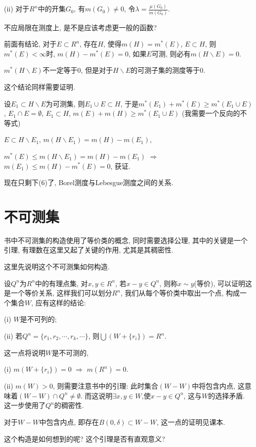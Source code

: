 \documentclass[12pt,a4paper,openany]{book}
\begin{document}
(ii) 对于$R^n$中的开集$G_0$, 有$m(G_0) \neq 0$, 令$\lambda = \frac{\mu(G_0)}{m(G_0)}$.

不应局限在测度上, 是不是应该考虑更一般的函数?

前面有结论, 对于$E \subset R^n$, 存在$H$, 使得$m(H) = m^*(E)$, $E \subset H$, 则$m^*(E) < \infty$时, $m(H) -m^*(E) = 0$, 如果$E$可测, 则必有$m(H \backslash E) = 0$.

$m^*(H \backslash E)$不一定等于0, 但是对于$H \backslash E$的可测子集的测度等于0.

这个结论同样需要证明.

设$E_1 \subset H \backslash E$为可测集, 则$E_1 \cup E \subset H$, 于是$m^*(E_1) + m^*(E) \ge m^*(E_1 \cup E)$, $E_1 \cap E = \emptyset$, $E_1 \subset H$, $m(E) + m(H) \ge m^*(E_1 \cup E)$ (我需要一个反向的不等式)

$E \subset H \backslash E_1$, $m(H \backslash E_1) = m(H) - m(E_1)$,

$m^*(E) \le m(H \backslash E_1) = m(H) - m(E_1)$ $\Rightarrow$ $m(E_1) \le m(H) - m^*(E) = 0$, 获证.

现在只剩下(6)了, Borel测度与Lebesgue测度之间的关系.

\section{不可测集}
书中不可测集的构造使用了等价类的概念, 同时需要选择公理, 其中的关键是一个引理, 有理数在这里又起了关键的作用, 尤其是其稠密性.

这里先说明这个不可测集如何构造.

设$Q^n$为$R^n$中的有理点集, 对$x, y \in R^n$, 若$x - y \in Q^n$, 则称$x \sim y$(等价), 可以证明这是一个等价关系, 这样我们可以划分$R^n$, 我们从每个等价类中取出一个点, 构成一个集合$W$, 应有这样的结论:

(i) $W$是不可列的;

(ii) 若$Q^n = \{r_1, r_2, \cdots, r_k, \cdots\}$, 则$\bigcup{(W + \{r_i\})} = R^n$.

这一点将说明$W$是不可测的, 

(i) $m(W + \{r_i\}) = 0$ $\Rightarrow$ $m(R^n) = 0$.

(ii) $m(W) > 0$, 则需要注意书中的引理: 此时集合$(W - W)$中将包含内点, 这意味着$(W - W) \cap Q^n \neq \emptyset$. 而这说明$\exists x, y \in W$,使$x - y \in Q^n$, 这与$W$的选择矛盾. 这一步使用了$Q^n$的稠密性.

对于$W-W$中包含内点, 即存在$B(0, \delta) \subset W-W$, 这一点的证明见课本.

这个构造是如何想到的呢? 这个引理是否有直观意义?
\end{document}
